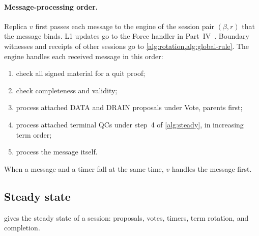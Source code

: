 \documentclass[11pt,a4paper]{article}
\newcommand{\RR}[1]{{\color{rrRed}#1}}
\begin{document}
\paragraph{Message-processing order.}\leavevmode
\RR{Replica $v$ first passes each message to the engine of the session
pair $(\beta,r)$ that the message binds. L1 updates go to the Force handler in Part~IV~\cite{part4}. Boundary witnesses and receipts of
other sessions go to \cref{alg:rotation,alg:global-rule}.} The engine handles each received
message in this order:
\begin{enumerate}[label=(\arabic*)]
\item check all signed material for a quit proof;
\item check completeness and validity;
\item process attached DATA \RR{and DRAIN} proposals under Vote, parents
first;
\item process attached terminal QCs under step~4 of \cref{alg:steady},
in increasing term order;
\item process the message itself.
\end{enumerate}
When a message and a timer fall at the same time, $v$ handles the
message first.

\subsection{Steady state}
\label{sec:steady}
 gives the steady state of a session: proposals, votes,
timers, term rotation, and completion.
\end{document}
